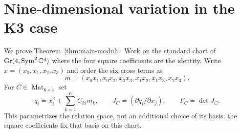 \section{Nine-dimensional variation in the K3 case}
\label{sec:moduli}
We prove Theorem~\ref{thm:main-moduli}. Work on the standard chart of
$\operatorname{Gr}(4,\operatorname{Sym}^2\mathbb C^4)$ where the four square coefficients are the identity.
Write $x=(x_0,x_1,x_2,x_3)$ and order the six cross terms as
\[
 m=(x_0x_1,x_0x_2,x_0x_3,x_1x_2,x_1x_3,x_2x_3).
\]
For $C\in\operatorname{Mat}_{6\times4}$ set
\begin{equation}\label{eq:chart-quadrics}
 q_i=x_i^2+\sum_{k=1}^6 C_{ki}m_k,\qquad
 J_C=(\partial q_i/\partial x_j),\qquad F_C=\det J_C.
\end{equation}
This parametrizes the relation space, not an additional choice of its
basis: the square coefficients fix that basis on this chart.

